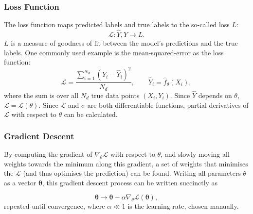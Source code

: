         \subsubsection{Loss Function}
            The loss function maps predicted labels and true labels to the so-called loss $L$: \[\mathcal{L} : \hat{Y}, Y \rightarrow L.\] $L$ is a measure of goodness of fit between the model's predictions and the true labels. One commonly used example is the mean-squared-error as the loss function:
            \begin{equation}
                \mathcal{L} = \frac{\sum_{i = 1}^{N_d}(Y_i - \hat{Y}_i)^2}{N_d}, \hspace{2em} \hat{Y}_i = \hat{f}_\theta(X_i),
            \end{equation}
            where the sum is over all $N_d$ true data points $(X_i, Y_i)$.
            Since $\hat{Y}$ depends on $\theta$, $\mathcal{L} = \mathcal{L}(\theta)$. Since $\mathcal{L}$ and $\sigma$ are both differentiable functions, partial derivatives of $\mathcal{L}$ with respect to $\theta$ can be calculated. 
        
        \subsubsection{Gradient Descent}
            By computing the gradient of $\nabla_\theta \mathcal{L}$ with respect to $\theta$, and slowly moving all weights towards the minimum along this gradient, a set of weights that minimises the $\mathcal{L}$ (and thus optimises the prediction) can be found. Writing all parameters $\theta$ as a vector $\boldsymbol{\theta}$, this gradient descent process can be written succinctly as
            
            \begin{equation}
                \boldsymbol{\theta} \rightarrow \boldsymbol{\theta} - \alpha \nabla_\theta \mathcal{L}(\boldsymbol{\theta}),
            \end{equation}
            repeated until convergence, where $\alpha \ll 1$ is the learning rate, chosen manually.